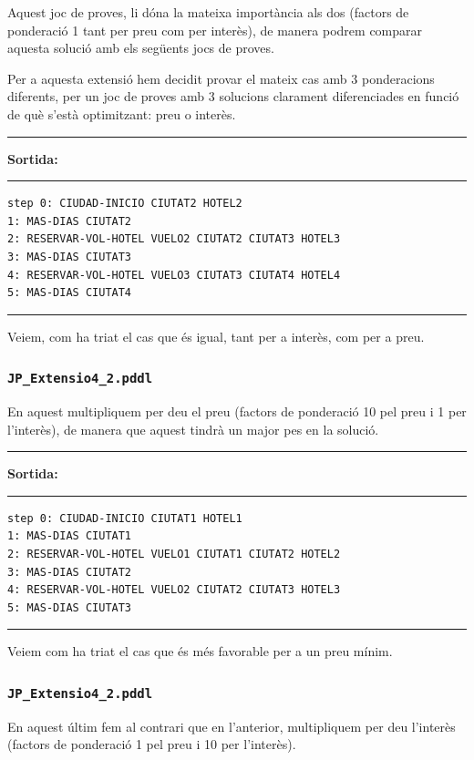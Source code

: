 \documentclass[11pt,a4paper]{article}
\begin{document}
Aquest joc de proves, li dóna la mateixa importància als dos (factors de ponderació 1 tant per preu com per interès), de manera podrem comparar aquesta solució amb els següents jocs de proves.

Per a aquesta extensió hem decidit provar el mateix cas amb 3 ponderacions diferents, per un joc de proves amb 3 solucions clarament diferenciades en funció de què s'està optimitzant: preu  o interès.

\begin{samepage}
\medskip
\noindent
\rule{0.1\textwidth}{0.5mm}
\textbf{Sortida:}
\rule{0.76\textwidth}{0.5mm}
\begin{verbatim}
step 0: CIUDAD-INICIO CIUTAT2 HOTEL2
1: MAS-DIAS CIUTAT2
2: RESERVAR-VOL-HOTEL VUELO2 CIUTAT2 CIUTAT3 HOTEL3
3: MAS-DIAS CIUTAT3
4: RESERVAR-VOL-HOTEL VUELO3 CIUTAT3 CIUTAT4 HOTEL4
5: MAS-DIAS CIUTAT4
\end{verbatim}
\rule{\textwidth}{0.5mm}
\medskip
\end{samepage}

Veiem, com ha triat el cas que és igual, tant per a interès, com per a preu.

\subsubsection*{\texttt{JP\_Extensio4\_2.pddl}}

En aquest multipliquem per deu el preu (factors de ponderació 10 pel preu i 1 per l'interès), de manera que aquest tindrà un major pes en la solució.

\begin{samepage}
\medskip
\noindent
\rule{0.1\textwidth}{0.5mm}
\textbf{Sortida:}
\rule{0.76\textwidth}{0.5mm}
\begin{verbatim}
step 0: CIUDAD-INICIO CIUTAT1 HOTEL1
1: MAS-DIAS CIUTAT1
2: RESERVAR-VOL-HOTEL VUELO1 CIUTAT1 CIUTAT2 HOTEL2
3: MAS-DIAS CIUTAT2
4: RESERVAR-VOL-HOTEL VUELO2 CIUTAT2 CIUTAT3 HOTEL3
5: MAS-DIAS CIUTAT3
\end{verbatim}
\rule{\textwidth}{0.5mm}
\medskip
\end{samepage}

Veiem com ha triat el cas que és més favorable per a un preu mínim.

\subsubsection*{\texttt{JP\_Extensio4\_2.pddl}}

En aquest últim fem al contrari que en l'anterior, multipliquem per deu l'interès (factors de ponderació 1 pel preu i 10 per l'interès).
\end{document}
